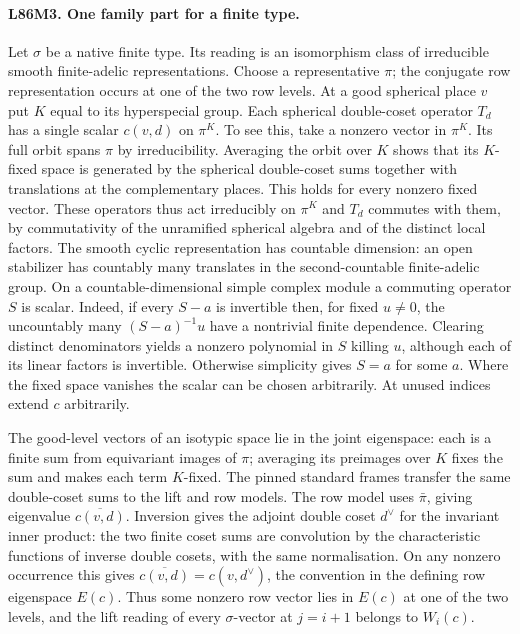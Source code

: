 \paragraph{L86M3. One family part for a finite type.}
Let $\sigma$ be a native finite type. Its reading is an isomorphism
class of irreducible smooth finite-adelic representations. Choose a
representative $\pi$; the conjugate row representation occurs at one
of the two row levels. At a good spherical place $v$ put $K$ equal
to its hyperspecial group. Each spherical double-coset operator
$T_d$ has a single scalar $c(v,d)$ on $\pi^K$. To see this, take a
nonzero vector in $\pi^K$. Its full orbit spans $\pi$ by
irreducibility. Averaging the orbit over $K$ shows that its $K$-fixed
space is generated by the spherical double-coset sums together with
translations at the complementary places. This holds for every nonzero
fixed vector. These operators thus act irreducibly on $\pi^K$ and
$T_d$ commutes with them, by commutativity of the unramified spherical
algebra and of the distinct local factors. The smooth cyclic
representation has countable dimension: an open stabilizer has
countably many translates in the second-countable finite-adelic
group. On a countable-dimensional simple complex module a commuting
operator $S$ is scalar. Indeed, if every $S-a$ is invertible then,
for fixed $u\ne0$, the uncountably many $(S-a)^{-1}u$ have a
nontrivial finite dependence. Clearing distinct denominators yields
a nonzero polynomial in $S$ killing $u$, although each of its linear
factors is invertible. Otherwise simplicity gives $S=a$ for some
$a$. Where the fixed space vanishes the scalar can be chosen
arbitrarily. At unused indices extend $c$ arbitrarily.

The good-level vectors of an isotypic space lie in the joint
eigenspace: each is a finite sum from equivariant images of $\pi$;
averaging its preimages over $K$ fixes the sum and makes each term
$K$-fixed. The pinned standard frames transfer the same
double-coset sums to the lift and row models. The row model uses
$\bar\pi$, giving eigenvalue $\overline{c(v,d)}$. Inversion gives
the adjoint double coset $d^\vee$ for the invariant inner product:
the two finite coset sums are convolution by the characteristic
functions of inverse double cosets, with the same normalisation.
On any nonzero occurrence this gives
$\overline{c(v,d)}=c(v,d^\vee)$, the convention in the defining
row eigenspace $E(c)$. Thus some nonzero row vector lies in
$E(c)$ at one of the two levels, and the lift reading of every
$\sigma$-vector at $j=i+1$ belongs to $W_i(c)$.


